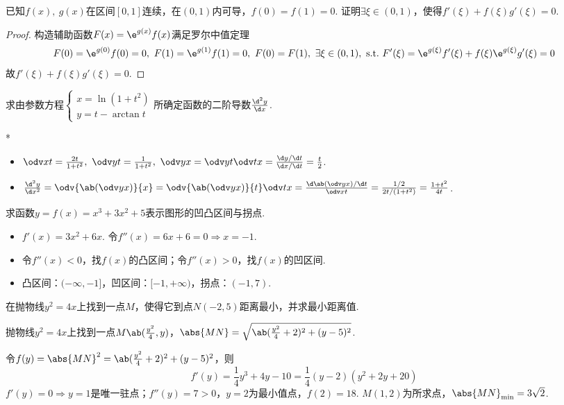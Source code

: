 \begin{problem}[罗尔中值定理]
    已知$f(x),\ g(x)$在区间$[0,1]$连续，在$(0,1)$内可导，$f(0)=f(1)=0$. 证明$\exists\xi\in (0,1)$，使得$f'(\xi)+f(\xi)g'(\xi)=0$.
\end{problem}
\begin{solution}
\begin{proof}
    构造辅助函数$F(x)=\e^{g(x)}f(x)$满足罗尔中值定理
    \[F(0)=\e^{g(0)}f(0)=0,\ F(1)=\e^{g(1)}f(1)=0,\ F(0)=F(1),\ \exists\xi\in(0,1),\ \text{s.t.}\ F'(\xi)=\e^{g(\xi)}f'(\xi)+f(\xi)\e^{g(\xi)}g'(\xi)=0\]
    故$f'(\xi)+f(\xi)g'(\xi)=0$.
\end{proof}
\end{solution}

\begin{problem}[参数方程求导]
    求由参数方程$\begin{cases}
        x=\ln(1+t^2)\\
        y=t-\arctan t
    \end{cases}$所确定函数的二阶导数$\frac{\d^2y}{\d x}$.
\end{problem}
\begin{solution}*
    \begin{itemize}
        \item $\odv xt=\frac{2t}{1+t^2},\ \odv yt=\frac{1}{1+t^2},\ \odv yx=\odv yt\odv tx=\frac{\d y/\d t}{\d x/\d t}=\frac t2$.
        \item $\frac{\d^2y}{\d x^2}=\odv{\ab(\odv yx)}{x}=\odv{\ab(\odv yx)}{t}\odv tx=\frac{\d\ab(\odv yx)/\d t}{\odv xt}=\frac{1/2}{2t/(1+t^2)}=\frac{1+t^2}{4t}$.
    \end{itemize}
\end{solution}

\begin{problem}[函数的凹凸区间和拐点]
    求函数$y=f(x)=x^3+3x^2+5$表示图形的凹凸区间与拐点.
\end{problem}
\begin{solution}
\begin{itemize}
    \item $f'(x)=3x^2+6x$. 令$f''(x)=6x+6=0\Rightarrow x=-1$.
    \item 令$f''(x)<0$，找$f(x)$的凸区间；令$f''(x)>0$，找$f(x)$的凹区间.
    \item 凸区间：$(-\infty,-1]$，凹区间：$[-1,+\infty)$，拐点：$(-1,7)$.
\end{itemize}
\end{solution}

\begin{problem}[函数的极值]
    在抛物线$y^2=4x$上找到一点$M$，使得它到点$N(-2,5)$距离最小，并求最小距离值.
\end{problem}
\begin{solution}
    抛物线$y^2=4x$上找到一点$M\ab(\frac{y^2}{4},y)$，$\abs{MN}=\sqrt{\ab(\frac{y^2}{4}+2)^2+(y-5)^2}$.

    令$f(y)=\abs{MN}^2=\ab(\frac{y^2}{4}+2)^2+(y-5)^2$，则
    \[f'(y)=\frac14y^3+4y-10=\frac14(y-2)(y^2+2y+20)\]
    $f'(y)=0\Rightarrow y=1$是唯一驻点；$f''(y)=7>0$，$y=2$为最小值点，$f(2)=18$. $M(1,2)$为所求点，$\abs{MN}_{\min}=3\sqrt2$.
\end{solution}

